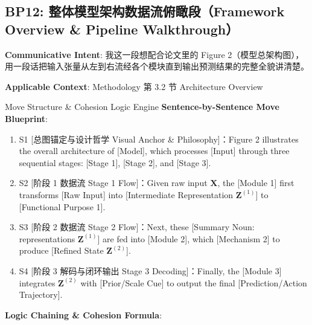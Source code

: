 \subsection{BP12: 整体模型架构数据流俯瞰段（Framework Overview \& Pipeline Walkthrough）}\label{sec:bp:BP12}
\noindent\textbf{\color{AcadNavy}Communicative Intent}: 我这一段想配合论文里的 Figure 2（模型总架构图），用一段话把输入张量从左到右流经各个模块直到输出预测结果的完整全貌讲清楚。\par\vspace{2pt}
\noindent\textbf{\color{AcadSlate}Applicable Context}: Methodology 第 3.2 节 Architecture Overview\par\vspace{4pt}
\begin{ConceptBox}{Move Structure \& Cohesion Logic Engine}
\textbf{Sentence-by-Sentence Move Blueprint}:
\begin{enumerate}[label=\textbf{\color{AcadNavy}S\arabic*.}, leftmargin=2em, itemsep=2pt]
  \item S1 [总图锚定与设计哲学 Visual Anchor \& Philosophy]：Figure 2 illustrates the overall architecture of [Model], which processes [Input] through three sequential stages: [Stage 1], [Stage 2], and [Stage 3].
  \item S2 [阶段 1 数据流 Stage 1 Flow]：Given raw input $\mathbf{X}$, the [Module 1] first transforms [Raw Input] into [Intermediate Representation $\mathbf{Z}^{(1)}$] to [Functional Purpose 1].
  \item S3 [阶段 2 数据流 Stage 2 Flow]：Next, these [Summary Noun: representations $\mathbf{Z}^{(1)}$] are fed into [Module 2], which [Mechanism 2] to produce [Refined State $\mathbf{Z}^{(2)}$].
  \item S4 [阶段 3 解码与闭环输出 Stage 3 Decoding]：Finally, the [Module 3] integrates $\mathbf{Z}^{(2)}$ with [Prior/Scale Cue] to output the final [Prediction/Action Trajectory].
\end{enumerate}\par\vspace{4pt}
\textbf{Logic Chaining \& Cohesion Formula}:\par{}
\end{ConceptBox}
